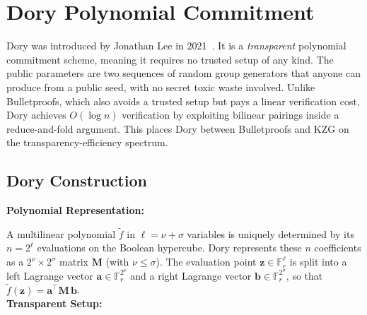 
\chapter{Dory Polynomial Commitment}
\label{chap:dory}

Dory was introduced by Jonathan Lee in 2021~\cite{dory2021}. It is a
\emph{transparent} polynomial commitment scheme, meaning it requires no
trusted setup of any kind. The public parameters are two sequences of random
group generators that anyone can produce from a public seed, with no secret
toxic waste involved. Unlike Bulletproofs, which also avoids a trusted setup
but pays a linear verification cost, Dory achieves $O(\log n)$ verification by
exploiting bilinear pairings inside a reduce-and-fold argument. This places
Dory between Bulletproofs and KZG on the transparency-efficiency spectrum.

\section{Dory Construction}

\textbf{Polynomial Representation:}

A multilinear polynomial $\tilde{f}$ in $\ell = \nu + \sigma$ variables is
uniquely determined by its $n = 2^\ell$ evaluations on the Boolean hypercube.
Dory represents these $n$ coefficients as a $2^\nu \times 2^\sigma$ matrix
$\mathbf{M}$ (with $\nu \leq \sigma$). The evaluation point
$\mathbf{z} \in \mathbb{F}_r^\ell$ is split into a left Lagrange vector
$\mathbf{a} \in \mathbb{F}_r^{2^\nu}$ and a right Lagrange vector
$\mathbf{b} \in \mathbb{F}_r^{2^\sigma}$, so that
$\tilde{f}(\mathbf{z}) = \mathbf{a}^\top \mathbf{M}\, \mathbf{b}$.
\\
\textbf{Transparent Setup:}

